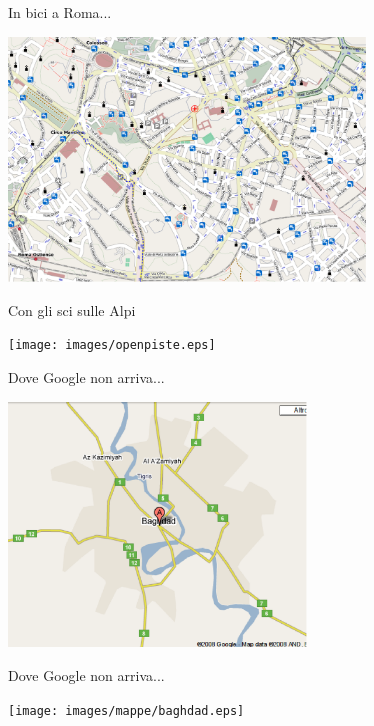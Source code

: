 \documentclass[slidestop,compress,red,notes,xcolor=dvipsnames]{beamer}	%
\begin{document}
        \begin{frame}{In bici a Roma...}
            \begin{center}
                \includegraphics[height=6.5cm]{images/mappe/roma.eps}
            \end{center}
        \end{frame}

        \begin{frame}{Con gli sci sulle Alpi}
            \begin{center}
                \texttt{[image: images/openpiste.eps]}
            \end{center}
        \end{frame}

        \begin{frame}{Dove Google non arriva...}
            \begin{center}
                \includegraphics[height=6.5cm]{images/mappe/baghdadgoogle.eps}
            \end{center}
        \end{frame}

        \begin{frame}{Dove Google non arriva...}
            \begin{center}
                \texttt{[image: images/mappe/baghdad.eps]}
            \end{center}
        \end{frame}
\end{document}
